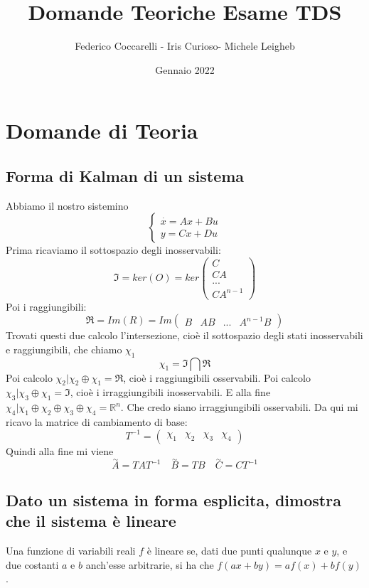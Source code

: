 \documentclass{article}
\title{Domande Teoriche Esame TDS}
\author{Federico Coccarelli - Iris Curioso- Michele Leigheb}
\date{Gennaio 2022}
\begin{document}
\large
\maketitle

\tableofcontents{}


\section{Domande di Teoria}

\subsection{Forma di Kalman di un sistema}
Abbiamo il nostro sistemino
\[ \begin{cases} \overset{\cdot}{x} = Ax+Bu\\y=Cx+Du \end{cases}\]
Prima ricaviamo il sottospazio degli inosservabili:
\[
\mathfrak{I} = ker(O) = ker\begin{pmatrix}C\\CA\\...\\CA^{n-1}\end{pmatrix}  
\]
Poi i raggiungibili:
\[
    \mathfrak{R} = Im(R) = Im\begin{pmatrix}B&AB&...&A^{n-1}B\end{pmatrix}
\]
Trovati questi due calcolo l'intersezione, cioè il sottospazio degli stati inosservabili e raggiungibili,
che chiamo $\chi_1$
\[
  \chi_1 =   \mathfrak{I}\bigcap\mathfrak{R}
\]
Poi calcolo $\chi_2 | \chi_2 \oplus  \chi_1 = \mathfrak{R}$, cioè i raggiungibili osservabili.
Poi calcolo $\chi_3 | \chi_3 \oplus  \chi_1 = \mathfrak{I}$, cioè i irraggiungibili inosservabili.
E alla fine $\chi_4 | \chi_1\oplus \chi_2 \oplus\chi_3 \oplus\chi_4  = \mathbb{R}^n$.
Che credo siano irraggiungibili osservabili.
Da qui mi ricavo la matrice di cambiamento di base:
\[ T^{-1} = \begin{pmatrix}\chi_1&\chi_2&\chi_3&\chi_4 \end{pmatrix}\]
Quindi alla fine mi viene 
\[
    \overset{\sim}{A} = TAT^{-1}\quad \overset{\sim}{B} = TB \quad \overset{\sim}{C} = CT^{-1}
\]

\subsection{Dato un sistema in forma esplicita, dimostra che il sistema è lineare}
Una funzione di variabili reali $f$ è lineare se, dati due punti qualunque
$x$ e $y$, e due costanti $a$ e $b$ anch'esse arbitrarie, si ha che $f(ax+by)=af(x)+bf(y)$.
\end{document}
